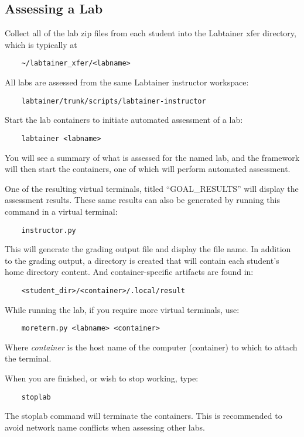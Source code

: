 \documentclass[12pt]{article}
\begin{document}
\subsection{Assessing a Lab}
Collect all of the lab zip files from each student into the Labtainer xfer directory, which
is typically at
\begin{verbatim}
    ~/labtainer_xfer/<labname>
\end{verbatim}
All labs are assessed from the same Labtainer instructor workspace:
\begin{verbatim}
    labtainer/trunk/scripts/labtainer-instructor
\end{verbatim}
\noindent Start the lab containers to initiate automated assessment of a lab:
\begin{verbatim}
    labtainer <labname>
\end{verbatim}
\noindent You will see a summary of what is assessed for the named lab, and the framework
will then start the containers, one of which will perform automated assessment.

One of the resulting virtual terminals, titled ``GOAL\_RESULTS'' will display the assessment results.
These same results can also be generated by running this command in a virtual terminal:
\begin{verbatim}
    instructor.py
\end{verbatim}
\noindent This will generate the grading output file and display the file name.  In
addition to the grading output, a directory is created that will contain each student's
home directory content.  And container-specific artifacts are found in:
\begin{verbatim}
    <student_dir>/<container>/.local/result
\end{verbatim}

\noindent While running the lab, if you require more virtual terminals, use:
\begin{verbatim}
    moreterm.py <labname> <container>
\end{verbatim}
\noindent Where \textit{container} is the host name of the computer (container) to which to attach the terminal.

\noindent When you are finished, or wish to stop working, type:
\begin{verbatim}
    stoplab
\end{verbatim}
The stoplab command will terminate the containers.  This is recommended to avoid network
name conflicts when assessing other labs.
\end{document}
